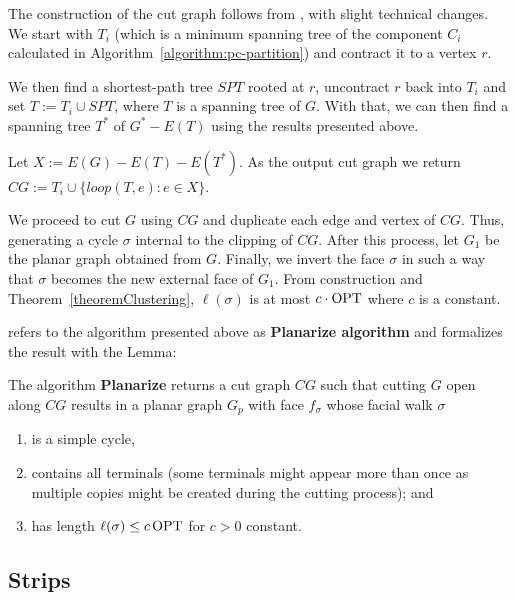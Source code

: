The construction of the cut graph follows from \cite{Borradaile2012}, with slight technical changes. We start with \(T_i\) (which is a minimum spanning tree of the component \(C_i\) calculated in Algorithm~\ref{algorithm:pc-partition}) and contract it to a vertex \(r\).

We then find a shortest-path tree \(SPT\) rooted at \(r\), uncontract \(r\) back into \(T_i\) and set \(T := T_i \cup SPT\), where \(T\) is a spanning tree of \(G\). With that, we can then find a spanning tree \(T^\ast\) of \(G^\ast - E(T)\) using the results presented above.

Let \(X := E(G) - E(T) - E(T^\ast)\). As the output cut graph we return \(CG := T_i \cup \{loop(T, e): e \in X\}\).

We proceed to cut \(G\) using \(CG\) and duplicate each edge and vertex of \(CG\). Thus, generating a cycle \(\sigma\) internal to the clipping of \(CG\). After this process, let \(G_1\) be the planar graph obtained from \(G\). Finally, we invert the face \(\sigma\) in such a way that \(\sigma\) becomes the new external face of \(G_1\). From construction and Theorem~\ref{theoremClustering}, \(\ell(\sigma)\) is at most \(c \cdot \operatorname{\textrm{OPT}}\) where \(c\) is a constant.

\citeauthor{Borradaile2012} refers to the algorithm presented above as \textbf{Planarize algorithm} and formalizes the result with the Lemma:

\begin{lemma}
    The algorithm \textbf{Planarize} returns a cut graph \(CG\) such that cutting \(G\) open along \(CG\) results in a planar graph \(G_p\) with face \(f_\sigma\) whose facial walk \(\sigma\)

    \begin{enumerate}
        \item is a simple cycle,
        \item contains all terminals (some terminals might appear more than once as multiple copies might be created during the cutting process); and
        \item has length \(\ell(\sigma) \leq c \operatorname{\textrm{OPT}}\) for \(c > 0\) constant.
    \end{enumerate}
\end{lemma}

\subsection{Strips}

